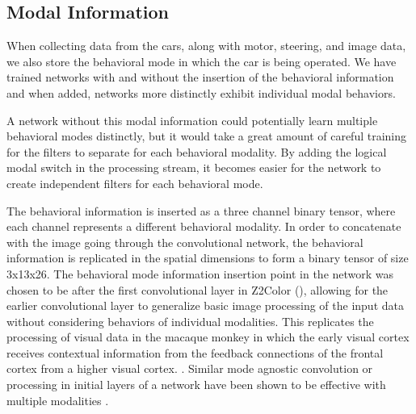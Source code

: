 \subsection{Modal Information}

When collecting data from the cars, along with motor, steering, and image data, we also store the behavioral mode in which the car is being operated. We have trained networks with and without the insertion of the behavioral information and when added, networks more distinctly exhibit individual modal behaviors.

A network without this modal information could potentially learn multiple behavioral modes distinctly, but it would take a great amount of careful training for the filters to separate for each behavioral modality. By adding the logical modal switch in the processing stream, it becomes easier for the network to create independent filters for each behavioral mode.

The behavioral information is inserted as a three channel binary tensor, where each channel represents a different behavioral modality. In order to concatenate with the image going through the convolutional network, the behavioral information is replicated in the spatial dimensions to form a binary tensor of size 3x13x26. The behavioral mode information insertion point in the network was chosen to be after the first convolutional layer in Z2Color (), allowing for the earlier convolutional layer to generalize basic image processing of the input data without considering behaviors of individual modalities. This replicates the processing of visual data in the macaque monkey in which the early visual cortex receives contextual information from the feedback connections of the frontal cortex from a higher visual cortex. \cite{zipser1996contextual}. Similar mode agnostic convolution or processing in initial layers of a network have been shown to be effective with multiple modalities \cite{firstlayernometa}.

